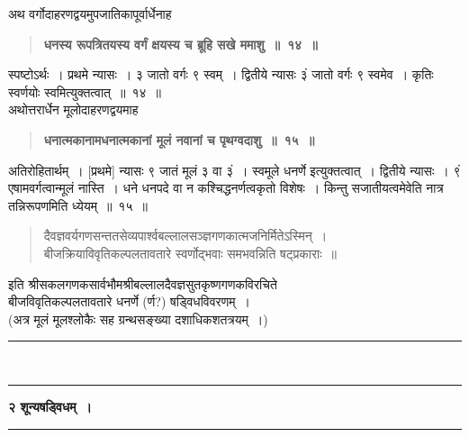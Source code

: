 \documentclass[11pt, openany]{book}
\begin{document}
\begin{sloppypar}
{\small अथ वर्गोदाहरणद्वयमुपजातिकापूर्वार्धेनाह\textendash }

 \label{1.14}
\begin{quote}
{\large \textbf{{\color{purple}धनस्य रूपत्रितयस्य वर्गं क्षयस्य च ब्रूहि सखे ममाशु~॥~१४~॥}}}
\end{quote}

स्पष्टोऽर्थः~। प्रथमे न्यासः~। ३ जातो वर्गः ९ स्वम्~। द्वितीये न्यासः ३ं जातो वर्गः ९ स्वमेव~। कृतिः स्वर्णयोः स्वमित्युक्तत्वात्~॥~१४~॥ \\

{\small अथोत्तरार्धेन मूलोदाहरणद्वयमाह\textendash }

 \label{1.15}
\begin{quote}
{\large \textbf{{\color{purple}धनात्मकानामधनात्मकानां मूलं नवानां च पृथग्वदाशु~॥~१५~॥}}}
\end{quote}

अतिरोहितार्थम्~। [प्रथमे] न्यासः ९ जातं मूलं ३ वा ३ं~। स्वमूले
धनर्णे इत्युक्तत्वात्~। द्वितीये न्यासः~। ९ं एषामवर्गत्वान्मूलं नास्ति~। धने धनपदे वा न कश्चिद्धनर्णत्वकृतो विशेषः~। किन्तु सजातीयत्वमेवेति नात्र तन्निरूपणमिति ध्येयम्~॥~१५~॥

\begin{quote}
{\color{violet}दैवज्ञवर्यगणसन्ततसेव्यपार्श्वबल्लालसञ्ज्ञगणकात्मजनिर्मितेऽस्मिन्~।\\
बीजक्रियाविवृतिकल्पलतावतारे स्वर्णोद्भवाः समभवन्निति षट्प्रकाराः~॥}
\end{quote}
\vspace{-1mm}

\begin{center}
इति श्रीसकलगणकसार्वभौमश्रीबल्लालदैवज्ञसुतकृष्णगणकविरचिते \\
बीजविवृतिकल्पलतावतारे धनर्णे (र्ण?) षड्विधविवरणम्~। \\
(अत्र मूलं मूलश्लोकैः सह ग्रन्थसङ्ख्या दशाधिकशतत्रयम्~।) \\
\vspace{6mm}

\rule{0.2\linewidth}{0.8pt}\\
\vspace{-4mm}

\rule{0.2\linewidth}{0.8pt}
\end{center}
\end{sloppypar}

\newpage
\thispagestyle{empty}

\begin{center}
\textbf{\large २\; शून्यषड्विधम्~।}\\
\rule{0.2\linewidth}{0.8pt}
\end{center}
\end{document}
